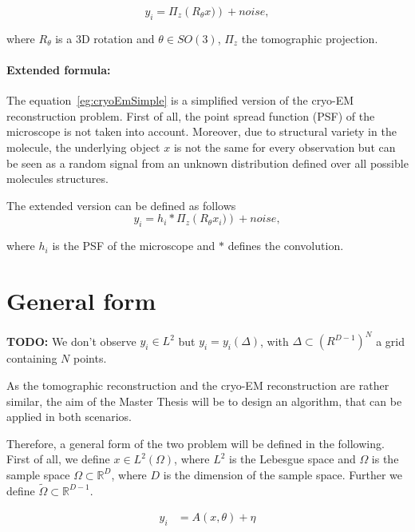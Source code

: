 \begin{equation}
    \label{eg:cryoEmSimple}
    y_i = \Pi_z \left( R_{\theta} x) \right) + noise,
\end{equation}

where $R_{\theta}$ is a 3D rotation and $\theta \in SO(3)$, $\Pi_z$ the tomographic projection.

\paragraph{Extended formula:} 
The equation~\ref{eg:cryoEmSimple} is a simplified version of the cryo-EM reconstruction problem.
First of all, the point spread function (PSF) of the microscope is not taken into account.
Moreover, due to structural variety in the molecule, the underlying object $x$ is not the same 
for every observation but can be seen as a random signal from an unknown distribution defined over all possible molecules structures.

The extended version can be defined as follows
\begin{equation}
    \label{eg:cryoEmExtended}
    y_i = h_i * \Pi_z \left( R_{\theta} x_i) \right) + noise,
\end{equation}

where $h_i$ is the PSF of the microscope and $*$ defines the convolution.

\section{General form}
\textbf{TODO:}
We don't observe $y_i \in L^2$ but $y_i = y_i(\Delta) $, with $\Delta \subset (R^{D-1})^N$ a grid containing $N$ points. 

As the tomographic reconstruction and the cryo-EM reconstruction are rather similar, 
the aim of the Master Thesis will be to design an algorithm, that can be applied in both scenarios.

Therefore, a general form of the two problem will be defined in the following.
First of all, we define $x \in L^2(\Omega)$, where $L^2$ is the Lebesgue space and $\Omega$
is the sample space $\Omega \subset \mathbb{R}^D$, where $D$ is the dimension of the sample space. 
Further we define $\tilde{\Omega} \subset \mathbb{R}^{D-1}$.


\begin{equation}
    \begin{aligned}
        y_i &= A(x, \theta) + \eta \\
    \end{aligned}
\end{equation}

